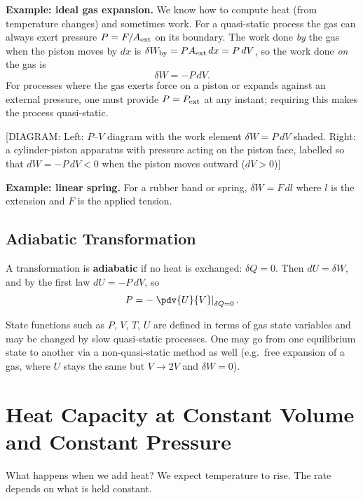 \textbf{Example: ideal gas expansion.} We know how to compute heat (from temperature changes)
and sometimes work. For a quasi-static process the gas can always exert pressure $P = F/A_{\rm ext}$
on its boundary. The work done \emph{by} the gas when the piston moves by $dx$ is
$\delta W_{\text{by}} = P A_{\rm ext}\,dx = P\,dV$, so the work done \emph{on} the gas is
\[
  \delta W = -P\,dV.
\]
For processes where the gas exerts force on a piston or expands against an external pressure,
one must provide $P = P_{\rm ext}$ at any instant; requiring this makes the process quasi-static.

\begin{center}
[DIAGRAM: Left: $P$--$V$ diagram with the work element $\delta W = P\,dV$ shaded. Right: a
cylinder-piston apparatus with pressure acting on the piston face, labelled so that
$dW = -P\,dV < 0$ when the piston moves outward ($dV > 0$)]
\end{center}

\textbf{Example: linear spring.} For a rubber band or spring, $\delta W = F\,dl$ where $l$ is
the extension and $F$ is the applied tension.

\subsection{Adiabatic Transformation}

\begin{definition}
A transformation is \textbf{adiabatic} if no heat is exchanged: $\delta Q = 0$. Then
$dU = \delta W$, and by the first law $dU = -P\,dV$, so
\[
  P = -\left.\pdv{U}{V}\right|_{\delta Q = 0}.
\]
\end{definition}

State functions such as $P$, $V$, $T$, $U$ are defined in terms of gas state variables and may
be changed by slow quasi-static processes. One may go from one equilibrium state to another via a
non-quasi-static method as well (e.g.\ free expansion of a gas, where $U$ stays the same but
$V \to 2V$ and $\delta W = 0$).


\section{Heat Capacity at Constant Volume and Constant Pressure}

What happens when we add heat? We expect temperature to rise. The rate depends on what is held
constant.

